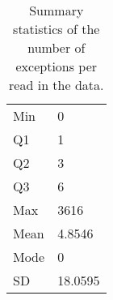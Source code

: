 \begin{table}
    \caption{\label{tab:nex} Summary statistics of the number of exceptions per read in the data.}
    \begin{tabular}{|l|l|}
        \hline
Min & 0\\
	    Q1 & 1\\

Q2 & 3\\
	    Q3 & 6\\
Max & 3616\\
\hline
Mean & 4.8546\\
	    Mode & 0\\
SD & 18.0595\\
	\hline
    \end{tabular}
\end{table}
